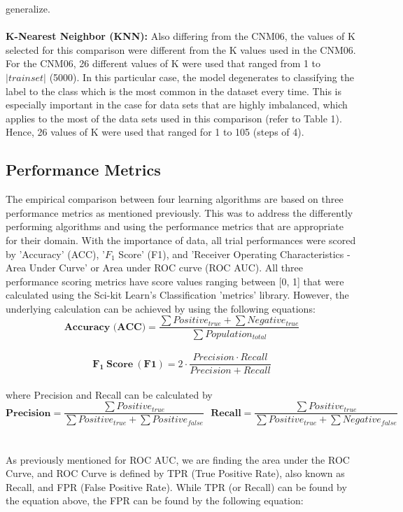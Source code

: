 \documentclass[twoside,11pt]{article}
\begin{document}
generalize. \\
\\
\textbf{K-Nearest Neighbor (KNN):} Also differing from the CNM06, the 
values of K selected for this comparison were different from the K values 
used in the CNM06. For the CNM06, 26 different values of K were used that 
ranged from 1 to \(|trainset|\) (5000). In this particular case, the 
model degenerates to classifying the label to the class which is the most 
common in the dataset every time. This is especially important in the case 
for data sets that are highly imbalanced, which applies to the most of the 
data sets used in this comparison (refer to Table 1). Hence, 26 values of K 
were used that ranged for 1 to 105 (steps of 4). \\

\subsection{Performance Metrics}

The empirical comparison between four learning algorithms are based on 
three performance metrics as mentioned previously. This was to address the 
differently performing algorithms and using the performance metrics that are 
appropriate for their domain. With the importance of data, all trial 
performances were scored by 'Accuracy' (ACC), '\(F_1\) Score' (F1), and 
'Receiver Operating Characteristics - Area Under Curve' or Area under ROC 
curve (ROC AUC). All three performance scoring metrics have score values 
ranging between [0, 1] that were calculated using the Sci-kit Learn's 
Classification 'metrics' library. However, the underlying calculation 
can be achieved by using the following equations: \\

\[ \textbf{Accuracy (ACC)} = \frac{\sum Positive_{true} + \sum Negative_{true}}{\sum Population_{total}}\]\\

\[ \mathbf{F_1 \ Score \ (F1)} = 2 \cdot \frac{Precision \cdot Recall}{Precision + Recall}\]\\

where Precision and Recall can be calculated by\\

\[\mathbf{Precision} = \frac{\sum Positive_{true}}{\sum Positive_{true} + \sum Positive_{false}} \ \ \
\mathbf{Recall} = \frac{\sum Positive_{true}}{\sum Positive_{true} + \sum Negative_{false}}\]\\
\\
As previously mentioned for ROC AUC, we are finding the area under the ROC Curve, 
and ROC Curve is defined by TPR (True Positive Rate), also known as Recall, and 
FPR (False Positive Rate). While TPR (or Recall) can be found by the equation above, 
the FPR can be found by the following equation: \\
\end{document}
